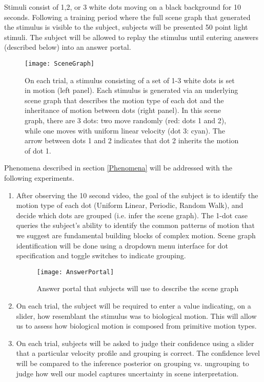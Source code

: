 \documentclass{scrartcl}
\begin{document}
Stimuli consist of 1,2, or 3 white dots moving on a black background for 10 seconds. Following a training period where the full scene graph that generated the stimulus is visible to the subject, subjects will be presented 50 point light stimuli. The subject will be allowed to replay the stimulus until entering answers (described below) into an answer portal. 

\begin{figure}[h]
    \centering
    \texttt{[image: SceneGraph]}
    \caption{On each trial, a stimulus consisting of a set of 1-3 white dots is set in motion (left panel). Each stimulus is generated via an underlying scene graph that describes the motion type of each dot and the inheritance of motion between dots (right panel). In this scene graph, there are 3 dots: two move randomly (red: dots 1 and 2), while one moves with uniform linear velocity (dot 3: cyan). The arrow between dots 1 and 2 indicates that dot 2 inherits the motion of dot 1.}
    \label{fig:scenegraph}
\end{figure}

Phenomena described in section \ref{Phenomena} will be addressed with the following experiments.

\begin{enumerate}
  \item After observing the 10 second video, the goal of the subject is to identify the motion type of each dot (Uniform Linear, Periodic, Random Walk), and decide which dots are grouped (i.e. infer the scene graph). The 1-dot case queries the subject's ability to identify the common patterns of motion that we suggest are fundamental building blocks of complex motion. Scene graph identification will be done using a dropdown menu interface for dot specification and toggle switches to indicate grouping.

\begin{figure}[h]
    \centering
    \texttt{[image: AnswerPortal]}
    \caption{Answer portal that subjects will use to describe the scene graph}
    \label{fig:answerportal}
\end{figure}

  \item On each trial, the subject will be required to enter a value indicating, on a slider, how resemblant the stimulus was to biological motion. This will allow us to assess how biological motion is composed from primitive motion types. 
  \item On each trial, subjects will be asked to judge their confidence using a slider that a particular velocity profile and grouping is correct. The confidence level will be compared to the inference posterior on grouping vs. ungrouping to judge how well our model captures uncertainty in scene interpretation. 
\end{enumerate}
\end{document}
